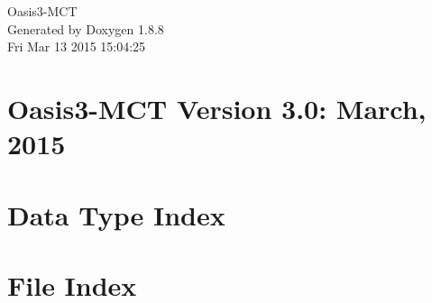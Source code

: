 \documentclass[twoside]{book}
\newcommand{\+}{\discretionary{\mbox{\scriptsize$\hookleftarrow$}}{}{}}
\newcommand{\clearemptydoublepage}{%
  \newpage{\pagestyle{empty}\cleardoublepage}%
}
\begin{document}
\hypersetup{pageanchor=false,
             bookmarks=true,
             bookmarksnumbered=true,
             pdfencoding=unicode
            }
\begin{titlepage}
\vspace*{7cm}
\begin{center}%
{\Large Oasis3-\/\+M\+C\+T }\\
\vspace*{1cm}
{\large Generated by Doxygen 1.8.8}\\
\vspace*{0.5cm}
{\small Fri Mar 13 2015 15:04:25}\\
\end{center}
\end{titlepage}
\clearemptydoublepage
\tableofcontents
\clearemptydoublepage
{}
\hypersetup{pageanchor=true}

\chapter{Oasis3-\/\+M\+C\+T Version 3.0\+: March, 2015}
\label{index}\hypertarget{index}{}
\chapter{Data Type Index}

\chapter{File Index}

\end{document}
